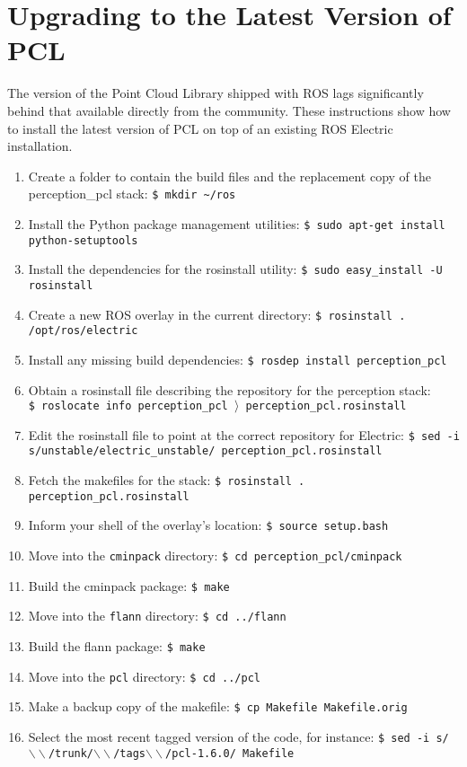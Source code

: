 \documentclass[12pt]{report}
\begin{document}
\section{Upgrading to the Latest Version of PCL}
The version of the Point Cloud Library shipped with ROS lags significantly behind that available directly from the community.  These instructions show how to install the latest version of PCL on top of an existing ROS Electric installation.
\begin{enumerate}
\item{Create a folder to contain the build files and the replacement copy of the perception\_pcl stack: \texttt{\$\ mkdir \~{}/ros}}
\item{Install the Python package management utilities: \texttt{\$\ sudo apt-get install python-setuptools}}
\item{Install the dependencies for the rosinstall utility: \texttt{\$\ sudo easy\_install -U rosinstall}}
\item{Create a new ROS overlay in the current directory: \texttt{\$\ rosinstall . /opt/ros/electric}}
\item{Install any missing build dependencies: \texttt{\$\ rosdep install perception\_pcl}}
\item{Obtain a rosinstall file describing the repository for the perception stack: \texttt{\$\ roslocate info perception\_pcl $\rangle$ perception\_pcl.rosinstall}}
\item{Edit the rosinstall file to point at the correct repository for Electric: \texttt{\$\ sed -i s/unstable/electric\_unstable/ perception\_pcl.rosinstall }}
\item{Fetch the makefiles for the stack: \texttt{\$\ rosinstall . perception\_pcl.rosinstall}}
\item{Inform your shell of the overlay's location: \texttt{\$\ source setup.bash}}
\item{Move into the \texttt{cminpack} directory: \texttt{\$\ cd perception\_pcl/cminpack}}
\item{Build the cminpack package: \texttt{\$\ make}}
\item{Move into the \texttt{flann} directory: \texttt{\$\ cd ../flann}}
\item{Build the flann package: \texttt{\$\ make}}
\item{Move into the \texttt{pcl} directory: \texttt{\$\ cd ../pcl}}
\item{Make a backup copy of the makefile: \texttt{\$\ cp Makefile Makefile.orig}}
\item{Select the most recent tagged version of the code, for instance: \texttt{\$\ sed -i s/$\backslash\backslash$/trunk/$\backslash\backslash$/tags$\backslash\backslash$/pcl-1.6.0/ Makefile}}

\end{enumerate}
\end{document}

